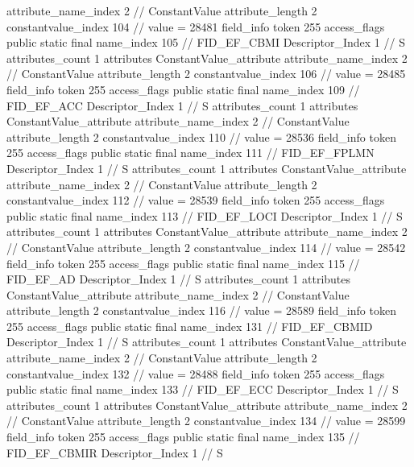 {{{{{{{					attribute_name_index	2		// ConstantValue
					attribute_length	2
					constantvalue_index	104		// value = 28481
				}
				}
			}
			field_info {
				token	255
				access_flags	public static final
				name_index	105		// FID_EF_CBMI
				Descriptor_Index	1		// S
				attributes_count	1
				attributes {
				ConstantValue_attribute {
					attribute_name_index	2		// ConstantValue
					attribute_length	2
					constantvalue_index	106		// value = 28485
				}
				}
			}
			field_info {
				token	255
				access_flags	public static final
				name_index	109		// FID_EF_ACC
				Descriptor_Index	1		// S
				attributes_count	1
				attributes {
				ConstantValue_attribute {
					attribute_name_index	2		// ConstantValue
					attribute_length	2
					constantvalue_index	110		// value = 28536
				}
				}
			}
			field_info {
				token	255
				access_flags	public static final
				name_index	111		// FID_EF_FPLMN
				Descriptor_Index	1		// S
				attributes_count	1
				attributes {
				ConstantValue_attribute {
					attribute_name_index	2		// ConstantValue
					attribute_length	2
					constantvalue_index	112		// value = 28539
				}
				}
			}
			field_info {
				token	255
				access_flags	public static final
				name_index	113		// FID_EF_LOCI
				Descriptor_Index	1		// S
				attributes_count	1
				attributes {
				ConstantValue_attribute {
					attribute_name_index	2		// ConstantValue
					attribute_length	2
					constantvalue_index	114		// value = 28542
				}
				}
			}
			field_info {
				token	255
				access_flags	public static final
				name_index	115		// FID_EF_AD
				Descriptor_Index	1		// S
				attributes_count	1
				attributes {
				ConstantValue_attribute {
					attribute_name_index	2		// ConstantValue
					attribute_length	2
					constantvalue_index	116		// value = 28589
				}
				}
			}
			field_info {
				token	255
				access_flags	public static final
				name_index	131		// FID_EF_CBMID
				Descriptor_Index	1		// S
				attributes_count	1
				attributes {
				ConstantValue_attribute {
					attribute_name_index	2		// ConstantValue
					attribute_length	2
					constantvalue_index	132		// value = 28488
				}
				}
			}
			field_info {
				token	255
				access_flags	public static final
				name_index	133		// FID_EF_ECC
				Descriptor_Index	1		// S
				attributes_count	1
				attributes {
				ConstantValue_attribute {
					attribute_name_index	2		// ConstantValue
					attribute_length	2
					constantvalue_index	134		// value = 28599
				}
				}
			}
			field_info {
				token	255
				access_flags	public static final
				name_index	135		// FID_EF_CBMIR
				Descriptor_Index	1		// S
}}}}}
